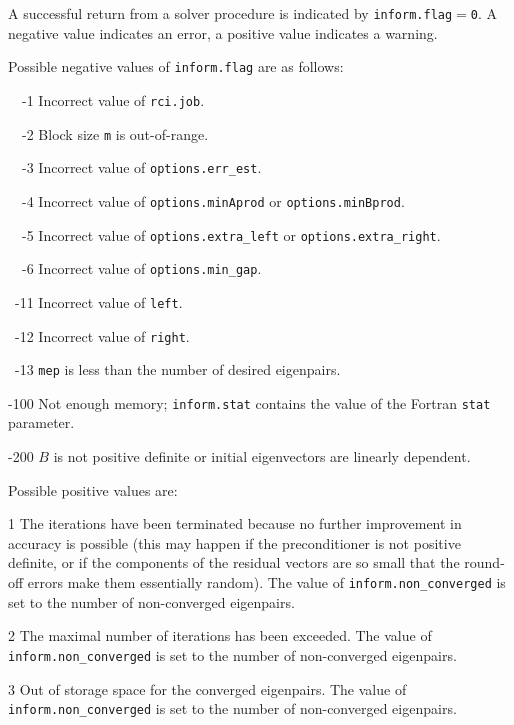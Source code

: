 \label{sec:err}

A successful return from
a solver procedure
is indicated 
by {\tt inform.flag$=$0}.
A negative value indicates an error, a positive value indicates a warning.

\label{sec:err.solve}

Possible negative values of {\tt inform.flag}
are as follows:
%
\begin{description}
%
\item{~~-1}
\hskip 9pt
Incorrect value of {\tt rci.job}.
%
\item{~~-2}
\hskip 9pt
Block size {\tt m} is out-of-range.
%
\item{~~-3}
\hskip 9pt
Incorrect value of 
{\tt options.err\_est}. %
%
\item{~~-4}
\hskip 9pt
Incorrect value of 
{\tt options.minAprod} or {\tt options.minBprod}.
%
\item{~~-5}
\hskip 9pt
Incorrect value of 
{\tt options.extra\_left} or
{\tt options.extra\_right}.
%
\item{~~-6}
\hskip 9pt
Incorrect value of 
{\tt options.min\_gap}. %
%
\item{~-11}
\hskip 7pt
Incorrect value of 
{\tt left}. %
%
\item{~-12}
\hskip 7pt
Incorrect value of 
{\tt right}. %
%
\item{~-13}
\hskip 7pt
{\tt mep} is less than 
the number of desired eigenpairs.
%
\item{-100}
\hskip 4pt
Not enough memory;
{\tt inform.stat} contains the value of the Fortran {\tt stat} parameter.
%
\item{-200}
\hskip 4pt
$B$ is not positive definite or initial eigenvectors are linearly dependent.
%
\end{description}

Possible positive values  are: 
%
\begin{description}
\item{1}
\hskip 9pt
The iterations have been terminated because no further improvement
in accuracy is possible (this may happen if the preconditioner is
not positive definite, or if the components of the residual vectors
are so small that the round-off
errors make them essentially random).
The value of {\tt inform.non\_converged} is set to the number
of non-converged eigenpairs.
\item{2}
\hskip 9pt
The maximal number of iterations has been exceeded.
The value of {\tt inform.non\_converged} is set to the number
of non-converged eigenpairs.
\item{3}
\hskip 9pt
Out of storage space for the converged eigenpairs.
The value of {\tt inform.non\_converged} is set to the number
of non-converged eigenpairs.
%
\end{description}

